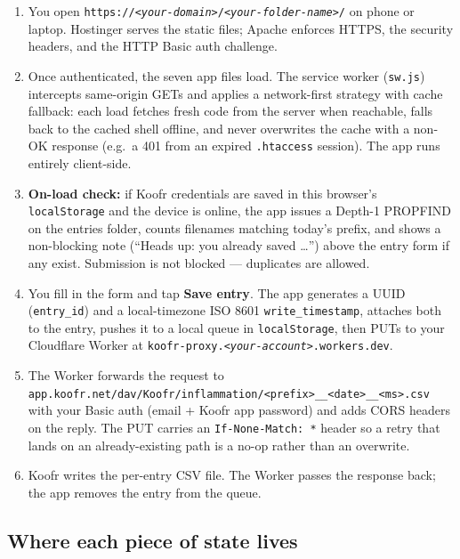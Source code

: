 \documentclass[11pt,a4paper]{article}
\begin{document}
\begin{enumerate}[leftmargin=*,nosep]
  \item You open \texttt{https://\textit{\color{red!70!black}<your-domain>}/\textit{\color{red!70!black}<your-folder-name>}/} on phone or laptop. Hostinger serves the static files; Apache enforces HTTPS, the security headers, and the HTTP Basic auth challenge.
  \item Once authenticated, the seven app files load. The service worker (\texttt{sw.js}) intercepts same-origin GETs and applies a network-first strategy with cache fallback: each load fetches fresh code from the server when reachable, falls back to the cached shell offline, and never overwrites the cache with a non-OK response (e.g.\ a 401 from an expired \texttt{.htaccess} session). The app runs entirely client-side.
  \item \textbf{On-load check:} if Koofr credentials are saved in this browser's \texttt{localStorage} and the device is online, the app issues a Depth-1 PROPFIND on the entries folder, counts filenames matching today's prefix, and shows a non-blocking note (``Heads up: you already saved \dots'') above the entry form if any exist. Submission is not blocked --- duplicates are allowed.
  \item You fill in the form and tap \textbf{Save entry}. The app generates a UUID (\texttt{entry\_id}) and a local-timezone ISO 8601 \texttt{write\_timestamp}, attaches both to the entry, pushes it to a local queue in \texttt{localStorage}, then PUTs to your Cloudflare Worker at \texttt{koofr-proxy.\textit{\color{red!70!black}<your-account>}.workers.dev}.
  \item The Worker forwards the request to \texttt{app.koofr.net/dav/Koofr/inflammation/<prefix>\_\_<date>\_\_<ms>.csv} with your Basic auth (email + Koofr app password) and adds CORS headers on the reply. The PUT carries an \texttt{If-None-Match: *} header so a retry that lands on an already-existing path is a no-op rather than an overwrite.
  \item Koofr writes the per-entry CSV file. The Worker passes the response back; the app removes the entry from the queue.
\end{enumerate}

\subsection{Where each piece of state lives}
\end{document}
